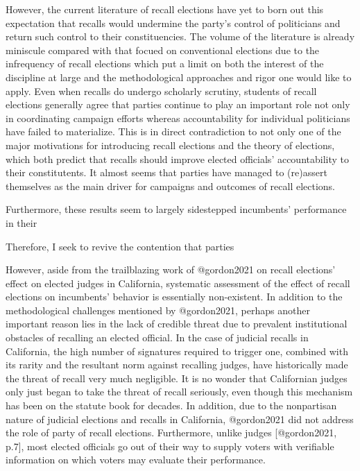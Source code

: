 \documentclass[crop=false]{standalone}
\begin{document}
	However, 
	the current literature of recall elections have yet to born out this expectation that recalls would undermine the party's control of politicians and return such control to their constituencies.
	The volume of the literature is already miniscule compared with that focued on conventional elections due to the infrequency of recall elections which put a limit on both
	the interest of the discipline at large and the methodological approaches and rigor one would like to apply.
	Even when recalls do undergo scholarly scrutiny, 
	students of recall elections generally agree that parties continue to play an important role
	not only in coordinating campaign efforts whereas accountability for individual politicians have failed to materialize.
	This is in direct contradiction to not only one of the major motivations for introducing recall elections and the theory of elections,
	which both predict that recalls should improve elected officials' accountability to their constitutents.
	It almost seems that parties have managed to (re)assert themselves as the main driver for campaigns and outcomes of recall elections.
	
	Furthermore, these results seem to largely sidestepped incumbents' performance in their
	
	Therefore, I seek to revive the contention that parties 
	
	However, aside from the trailblazing work of @gordon2021 on recall elections' effect on elected judges in California,
	systematic assessment of the effect of recall elections on incumbents' behavior is essentially non-existent.
	In addition to the methodological challenges mentioned by @gordon2021,
	perhaps another important reason lies in the lack of credible threat due to prevalent institutional obstacles of recalling an elected official.
	In the case of judicial recalls in California,
	the high number of signatures required to trigger one,
	combined with its rarity and the resultant norm against recalling judges, have historically made the threat of recall very much negligible.
	It is no wonder that Californian judges only just began to take the threat of recall seriously, even though this mechanism has been on the statute book for decades.
 	In addition, due to the nonpartisan nature of judicial elections and recalls in California, @gordon2021 did not address the role of party of recall elections.
 	Furthermore, unlike judges [@gordon2021, p.7], most elected officials go out of their way to supply voters with verifiable information on which voters may evaluate their performance.
\end{document}
